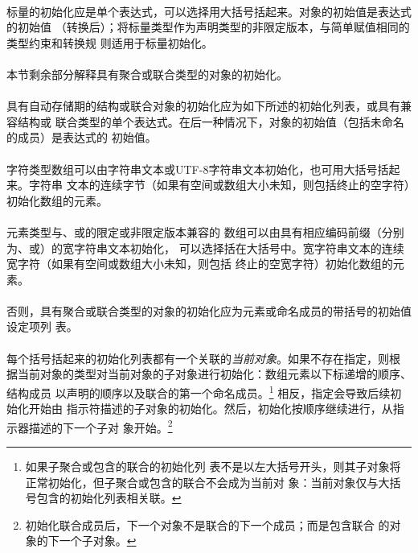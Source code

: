\paragraph{}
标量的初始化应是单个表达式，可以选择用大括号括起来。对象的初始值是表达式的初始值
（转换后）；将标量类型作为声明类型的非限定版本，与简单赋值相同的类型约束和转换规
则适用于标量初始化。

\paragraph{}
本节剩余部分解释具有聚合或联合类型的对象的初始化。

\paragraph{}
具有自动存储期的结构或联合对象的初始化应为如下所述的初始化列表，或具有兼容结构或
联合类型的单个表达式。在后一种情况下，对象的初始值（包括未命名的成员）是表达式的
初始值。

\paragraph{}
字符类型数组可以由字符串文本或UTF-8字符串文本初始化，也可用大括号括起来。字符串
文本的连续字节（如果有空间或数组大小未知，则包括终止的空字符）初始化数组的元素。

\paragraph{}
元素类型与、或的限定或非限定版本兼容的
数组可以由具有相应编码前缀（分别为、或）的宽字符串文本初始化，
可以选择括在大括号中。宽字符串文本的连续宽字符（如果有空间或数组大小未知，则包括
终止的空宽字符）初始化数组的元素。

\paragraph{}
否则，具有聚合或联合类型的对象的初始化应为元素或命名成员的带括号的初始值设定项列
表。

\paragraph{}
每个括号括起来的初始化列表都有一个关联的\textit{当前对象}。如果不存在指定，则根
据当前对象的类型对当前对象的子对象进行初始化：数组元素以下标递增的顺序、结构成员
以声明的顺序以及联合的第一个命名成员。\footnote{如果子聚合或包含的联合的初始化列
表不是以左大括号开头，则其子对象将正常初始化，但子聚合或包含的联合不会成为当前对
象：当前对象仅与大括号包含的初始化列表相关联。} 相反，指定会导致后续初始化开始由
指示符描述的子对象的初始化。然后，初始化按顺序继续进行，从指示器描述的下一个子对
象开始。\footnote{初始化联合成员后，下一个对象不是联合的下一个成员；而是包含联合
的对象的下一个子对象。}

